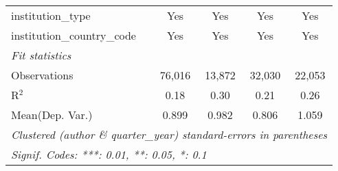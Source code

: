 \begin{tabular}{lcccc}
   institution\_type            & Yes           & Yes           & Yes           & Yes\\  
   institution\_country\_code   & Yes           & Yes           & Yes           & Yes\\  
   \midrule
   \emph{Fit statistics}\\
   Observations                 & 76,016        & 13,872        & 32,030        & 22,053\\  
   R$^2$                        & 0.18          & 0.30          & 0.21          & 0.26\\  
Mean(Dep. Var.) & 0.899 & 0.982 & 0.806 & 1.059 \\
   \midrule \midrule
   \multicolumn{5}{l}{\emph{Clustered (author \& quarter\_year) standard-errors in parentheses}}\\
   \multicolumn{5}{l}{\emph{Signif. Codes: ***: 0.01, **: 0.05, *: 0.1}}\\
\end{tabular}
\par\endgroup
